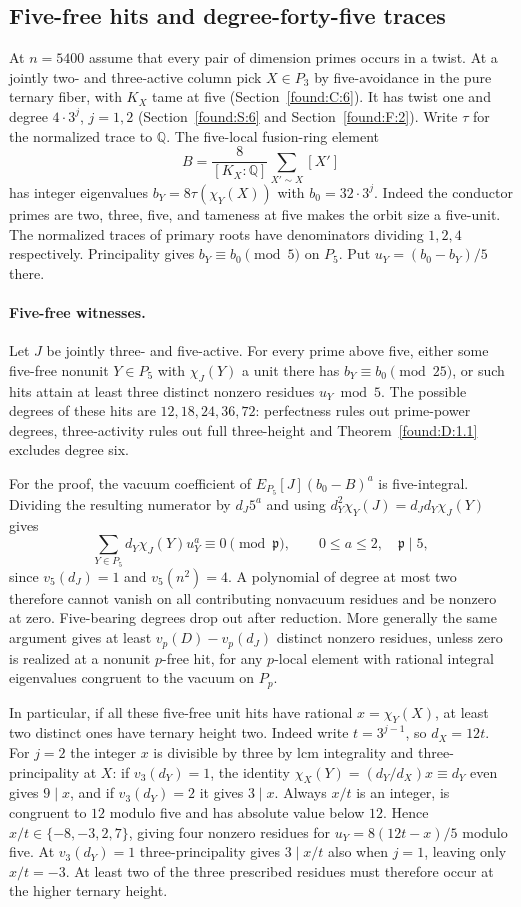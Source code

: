 \documentclass[11pt,a4paper]{article}
\numberwithin{equation}{section}
\theoremstyle{remark}
\begin{document}
\subsection{Five-free hits and degree-forty-five traces}\label{found:T:7}
At $n=5400$ assume that every pair of dimension primes occurs in a twist. At a jointly two- and three-active column pick $X\in P_3$ by five-avoidance in the pure ternary fiber, with $K_X$ tame at five (Section~\ref{found:C:6}). It has twist one and degree $4\cdot3^j$, $j=1,2$ (Section~\ref{found:S:6} and Section~\ref{found:F:2}). Write $\tau$ for the normalized trace to $\mathbb Q$. The five-local fusion-ring element
\[
 B=\frac8{[K_X:\mathbb Q]}\sum_{X'\sim X}[X']
\]
has integer eigenvalues $b_Y=8\tau(\chi_Y(X))$ with $b_0=32\cdot3^j$. Indeed the conductor primes are two, three, five, and tameness at five makes the orbit size a five-unit. The normalized traces of primary roots have denominators dividing $1,2,4$ respectively. Principality gives $b_Y\equiv b_0\pmod5$ on $P_5$. Put $u_Y=(b_0-b_Y)/5$ there.

\paragraph{Five-free witnesses.}
Let $J$ be jointly three- and five-active. For every prime above five, either some five-free nonunit $Y\in P_5$ with $\chi_J(Y)$ a unit there has $b_Y\equiv b_0\pmod{25}$, or such hits attain at least three distinct nonzero residues $u_Y\bmod5$. The possible degrees of these hits are $12,18,24,36,72$: perfectness rules out prime-power degrees, three-activity rules out full three-height and Theorem~\ref{found:D:1.1} excludes degree six.

For the proof, the vacuum coefficient of $E_{P_5}[J](b_0-B)^a$ is five-integral. Dividing the resulting numerator by $d_J5^a$ and using $d_Y^2\chi_Y(J)=d_Jd_Y\chi_J(Y)$ gives
\[
      \sum_{Y\in P_5} d_Y\chi_J(Y)u_Y^a\equiv0\pmod{\mathfrak p},
         \qquad 0\le a\le2,\quad\mathfrak p\mid5,
\]
since $v_5(d_J)=1$ and $v_5(n^2)=4$. A polynomial of degree at most two therefore cannot vanish on all contributing nonvacuum residues and be nonzero at zero. Five-bearing degrees drop out after reduction. More generally the same argument gives at least $v_p(D)-v_p(d_J)$ distinct nonzero residues, unless zero is realized at a nonunit $p$-free hit, for any $p$-local element with rational integral eigenvalues congruent to the vacuum on $P_p$.

In particular, if all these five-free unit hits have rational $x=\chi_Y(X)$, at least two distinct ones have ternary height two. Indeed write $t=3^{j-1}$, so $d_X=12t$. For $j=2$ the integer $x$ is divisible by three by lcm integrality and three-principality at $X$: if $v_3(d_Y)=1$, the identity $\chi_X(Y)=(d_Y/d_X)x\equiv d_Y$ even gives $9\mid x$, and if $v_3(d_Y)=2$ it gives $3\mid x$. Always $x/t$ is an integer, is congruent to $12$ modulo five and has absolute value below $12$. Hence $x/t\in\{-8,-3,2,7\}$, giving four nonzero residues for $u_Y=8(12t-x)/5$ modulo five. At $v_3(d_Y)=1$ three-principality gives $3\mid x/t$ also when $j=1$, leaving only $x/t=-3$. At least two of the three prescribed residues must therefore occur at the higher ternary height.
\end{document}
